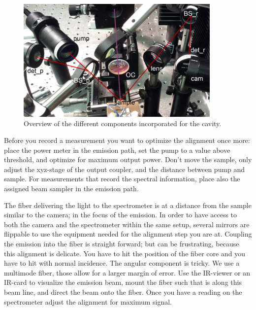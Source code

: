 \begin{figure}
\centering
\includegraphics[width=10cm]{img/cavity_all.jpg}
\caption{Overview of the different components incorporated for the cavity.}
\label{img:overview}
\end{figure}

Before you record a measurement
you want to optimize the alignment once more:
place the power meter
in the emission path,
set the pump to a value
above threshold,
and optimize
for maximum output power.
Don't move the sample,
only adjust
the xyz-stage
of the output coupler,
and the distance between
pump and sample.
For measurements
that record the spectral information,
place also the assigned beam sampler
in the emission path.

The fiber delivering the light
to the spectrometer
is at a distance
from the sample
similar to the camera;
in the focus of the emission.
In order to have access
to both the camera
and the spectrometer
within the same setup,
several mirrors
are flippable
to use the equipment needed for the alignment step
you are at.
Coupling the emission
into the fiber
is straight forward;
but can be frustrating,
because this alignment is delicate.
You have to hit the position of the fiber core
and you have to hit
with normal incidence.
The angular component
is tricky.
We use a multimode fiber,
those allow for a larger margin of error.
Use the IR-viewer or an IR-card
to visualize the emission beam,
mount the fiber
such that is along this beam line,
and direct the beam onto the fiber.
Once you have a reading
on the spectrometer
adjust the alignment
for maximum signal.
